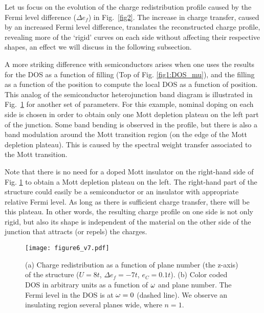 \documentclass[twocolumn, preprintnumbers,prb,aps,amssymb,showpacs]{revtex4}
\begin{document}
Let us focus on the evolution of the charge redistribution profile caused by the Fermi level
difference ($\Delta e_{f}$) in Fig.~\ref{fig2}. The increase in charge
transfer, caused by an increased Fermi level difference, translates
the reconstructed charge profile, revealing more of the `rigid' curves on each side
without affecting their respective shapes, an effect we will discuss in the following subsection. 

A more striking difference with semiconductors arises when one uses the results for the DOS as a function of filling (Top of Fig. \ref{fig1:DOS_mu}), and the filling as a function of the position to compute the local DOS as a function of position. This analog of the semiconductor heterojunction band diagram is illustrated in Fig.~\ref{fig4} for another set of parameters. For this example, nominal doping on each side is chosen in order to obtain only one Mott depletion
plateau on the left part of the junction. Some band bending is observed in
the profile, but there is also a band modulation around the Mott transition
region (on the edge of the Mott depletion plateau). This is caused by the
spectral weight transfer associated to the Mott transition.

Note that there is no need for a doped Mott insulator on the right-hand side of Fig. %
\ref{fig4} to obtain a Mott depletion plateau on the left. The right-hand part of
the structure could easily be a semiconductor or an insulator with appropriate
relative Fermi level. As long as there is sufficient charge transfer, there
will be this plateau. In other words, the resulting charge profile on
one side is not only rigid, but also its shape is independent of the
material on the other side of the junction that attracts (or repels) the charges.
\begin{figure}[tbp]
\vspace{2em}
\par
\begin{center}
\texttt{[image: figure6\_v7.pdf]}
\end{center}
\caption{(a) Charge redistribution as a function of plane number
(the z-axis) of the structure ($U=8t$, $\Delta e_f =-7t$, $e_{C}=0.1t$).
(b) Color coded DOS in arbitrary units as a function of $\protect%
\omega$ and plane number. The Fermi level in the DOS is at $\protect\omega=0$ (dashed line). We observe an insulating region
several planes wide, where $n=1$.}
\label{fig4}
\end{figure}

\end{document}
